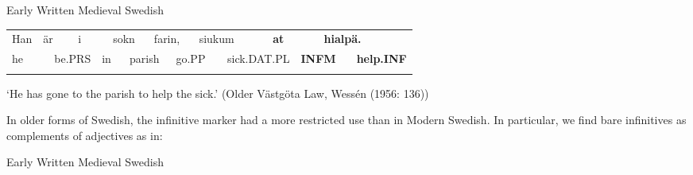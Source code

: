\begin{listWWNumileveli}
\item {}

\begin{styleExample}
Early Written Medieval Swedish

\end{styleExample}

\end{listWWNumileveli}

\begin{tabular}{llllllllllllllll}
\lsptoprule
Han & \multicolumn{2}{l}{är

} & \multicolumn{2}{l}{i

} & \multicolumn{2}{l}{sokn

} & \multicolumn{2}{l}{farin,

} & \multicolumn{2}{l}{siukum

} & \multicolumn{2}{l}{{\bfseries at}

} & \multicolumn{2}{l}{{\bfseries hialpä.}

} & \\
\multicolumn{2}{l}{he

} & \multicolumn{2}{l}{be.PRS

} & \multicolumn{2}{l}{in

} & \multicolumn{2}{l}{parish

} & \multicolumn{2}{l}{go.PP

} & \multicolumn{2}{l}{sick.DAT.PL

} & \multicolumn{2}{l}{{\bfseries INFM}

} & \multicolumn{2}{l}{{\bfseries help.INF}

}\\
\lspbottomrule
\end{tabular}

\begin{styleTranslation}
‘He has gone to the parish to help the sick.’ (Older Västgöta Law, Wessén (1956: 136)) 

\end{styleTranslation}

\begin{styleBodyTextFirst}
In older forms of Swedish, the infinitive marker had a more restricted use than in Modern Swedish. In particular, we find bare infinitives as complements of adjectives as in:

\end{styleBodyTextFirst}

\begin{listWWNumileveli}
\item {}

\begin{styleExample}
Early Written Medieval Swedish

\end{styleExample}

\end{listWWNumileveli}

